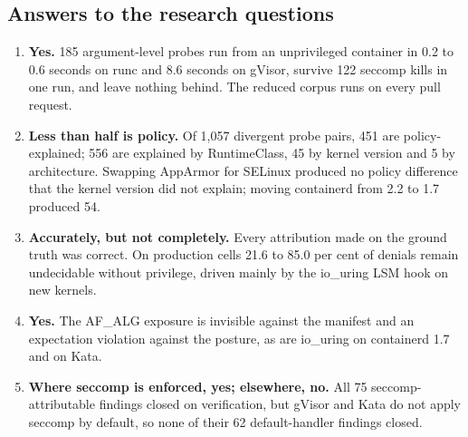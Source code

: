 \subsection{Answers to the research questions}
\begin{enumerate}[label=\textbf{RQ\arabic*},leftmargin=*]
\item \textbf{Yes.} 185 argument-level probes run from an unprivileged container in 0.2 to 0.6 seconds on runc and 8.6 seconds on gVisor, survive 122 seccomp kills in one run, and leave nothing behind. The reduced corpus runs on every pull request.
\item \textbf{Less than half is policy.} Of 1,057 divergent probe pairs, 451 are policy-explained; 556 are explained by RuntimeClass, 45 by kernel version and 5 by architecture. Swapping AppArmor for SELinux produced no policy difference that the kernel version did not explain; moving containerd from 2.2 to 1.7 produced 54.
\item \textbf{Accurately, but not completely.} Every attribution made on the ground truth was correct. On production cells 21.6 to 85.0 per cent of denials remain undecidable without privilege, driven mainly by the io\_uring LSM hook on new kernels.
\item \textbf{Yes.} The AF\_ALG exposure is invisible against the manifest and an expectation violation against the posture, as are io\_uring on containerd 1.7 and on Kata.
\item \textbf{Where seccomp is enforced, yes; elsewhere, no.} All 75 seccomp-attributable findings closed on verification, but gVisor and Kata do not apply seccomp by default, so none of their 62 default-handler findings closed.
\end{enumerate}

